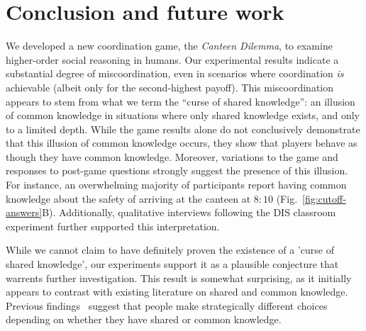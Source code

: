 \section{Conclusion and future work} \label{S:conclusion}
We developed a new coordination game, the \emph{Canteen Dilemma}, to examine higher-order social reasoning in humans. Our experimental results %
indicate a substantial degree of miscoordination, even in scenarios where coordination \emph{is} achievable (albeit only for the second-highest payoff). This miscoordination appears to stem from what we term the ``curse of shared knowledge'': an illusion of common knowledge in situations where only shared knowledge exists, and only to a limited depth. While the game results alone do not conclusively demonstrate that this illusion of common knowledge occurs, they show that players behave as though they have common knowledge. Moreover, variations to the game and responses to post-game questions strongly suggest the presence of this illusion. For instance, an overwhelming majority of participants report having common knowledge about the safety of arriving at the canteen at $8{:}10$ (Fig.~\ref{fig:cutoff-answers}B). Additionally, qualitative interviews following the DIS classroom experiment further supported this interpretation. 

While we cannot claim to have definitely proven the existence of a 'curse of shared knowledge', our experiments support it as a plausible conjecture that warrents further investigation. This result is somewhat surprising, as it initially appears to contrast with existing literature on shared and common knowledge. 
Previous findings~\cite{lee2010rationales, thomas2014psychology, thomas2016recursive, thomas2018common, de2019common, de2019maimonides} suggest that people make strategically different choices depending on whether they have shared or common knowledge. 

